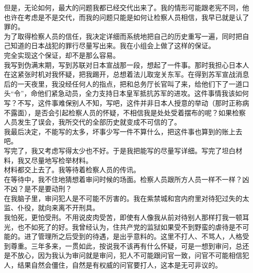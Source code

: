 但是，无论如何，最大的问题我都已经交代出来了。我的情形可能跟老宪不同，他也许在考虑是不是交代，而我的问题只能是如何让检察人员相信，我早已就是认了罪的。\\

为了取得检察人员的信任，我决定详细而系统地把自己的历史重写一遍，同时把自己知道的日本战犯的罪行尽量写出来。我在小组会上做了这样的保证。\\

完全实现这个保证，却不是那么容易。\\

我写到伪满末期，写到苏联对日本宣战那一段，想起了一件事。那时我担心日本人在这紧张时机对我怀疑，把我踢开，总想着法儿取宠关东军。在得到苏军宣战消息后的一天夜里，我没经任何人的指点，把和总务厅长官叫了来，给他们下了一道口头“令”，命他们紧急动员，全力支持日本皇军抵抗苏军的进攻。这件事情我该如何写？不写，这件事难保别人不知，写吧，这件并非日本人授意的举动（那时正称病不露面），是否会引起检察人员的怀疑，不相信我是处处受着摆布的呢？如果检察人员发生了误会，我所交代的全部历史就变成不可信的了。\\

我最后决定，不能写的太多，坏事少写一件不算什么，把这件事也算到的账上去吧。\\

写完了，我又考虑写得太少也不好。于是我把能写的尽量写详细。写完了坦白材料，我又尽量地写检举材料。\\

材料都交上去了。我等待着检察人员的传讯。\\

在等待中，我不住地猜想着审问时候的场面。检察人员跟所方人员一样不一样？凶不凶？是不是要动刑？\\

在我脑子里，审问犯人是不可能不厉害的。我在紫禁城和宫内府里对待犯过失的太监、仆役，就向来离不开刑具。\\

我怕死，更怕受刑。不用说皮肉受苦，即使有人像我从前对待别人那样打我一顿耳光，也不如死了的好。我曾经认为，住共产党的监狱如果受不到野蛮的虐待是不可能的。进了管理所之后受到的待遇，是出乎意料的。这里不打人、不骂人，人格受到尊重。三年多来，一贯如此，按说我不该再有什么怀疑，可是一想到审问，总还是不放心，因为我认为审问就是审问，犯人不可能跟问官一致，问官不可能相信犯人，结果自然会僵住，自然是有权威的问官要打人，这本是无可非议的。\\

